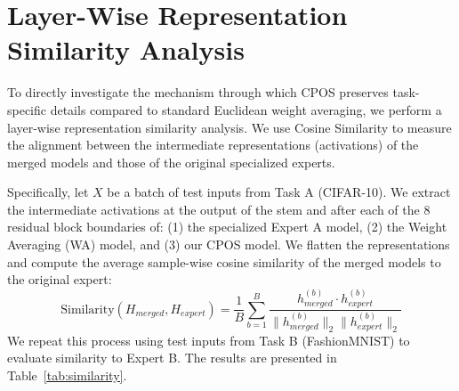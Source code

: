 \documentclass{article}
\theoremstyle{plain}
\theoremstyle{definition}
\theoremstyle{remark}
\begin{document}
\section{Layer-Wise Representation Similarity Analysis}
\label{sec:appendix_similarity}
To directly investigate the mechanism through which CPOS preserves task-specific details compared to standard Euclidean weight averaging, we perform a layer-wise representation similarity analysis. We use Cosine Similarity to measure the alignment between the intermediate representations (activations) of the merged models and those of the original specialized experts.

Specifically, let $X$ be a batch of test inputs from Task A (CIFAR-10). We extract the intermediate activations at the output of the stem and after each of the 8 residual block boundaries of: (1) the specialized Expert A model, (2) the Weight Averaging (WA) model, and (3) our CPOS model. We flatten the representations and compute the average sample-wise cosine similarity of the merged models to the original expert:
\begin{equation}
\text{Similarity}(H_{merged}, H_{expert}) = \frac{1}{B} \sum_{b=1}^B \frac{h_{merged}^{(b)} \cdot h_{expert}^{(b)}}{\|h_{merged}^{(b)}\|_2 \|h_{expert}^{(b)}\|_2}
\end{equation}
We repeat this process using test inputs from Task B (FashionMNIST) to evaluate similarity to Expert B. The results are presented in Table~\ref{tab:similarity}.
\end{document}
